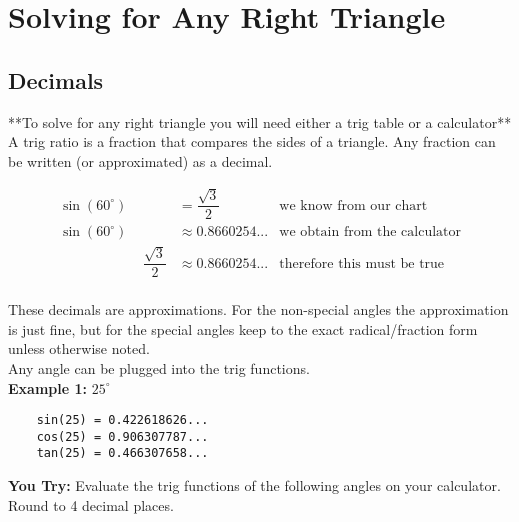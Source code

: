 \documentclass[12pt]{article}
\begin{document}
\section*{Solving for Any Right Triangle}

\subsection*{Decimals}

**To solve for any right triangle you will need either a trig table or a calculator** \\

A trig ratio is a fraction that compares the sides of a triangle. Any fraction can be written (or approximated) as a decimal. 


\begin{align*}
\sin(60^\circ)&=\dfrac{\sqrt{3}}{2}  &\text{we know from our chart}\\
\sin(60^\circ)&\approx 0.8660254... &\text{we obtain from the calculator}\\
\hspace{1in}\dfrac{\sqrt{3}}{2} &\approx  0.8660254...& \text{therefore this must be true}\\
\end{align*}


These decimals are approximations. For the non-special angles the approximation is just fine, but for the special angles keep to the exact radical/fraction form unless otherwise noted.\\

Any angle can be plugged into the trig functions. \\

\textbf{Example 1:} $25^\circ$
\begin{center}
\begin{BVerbatim}
	sin(25) = 0.422618626...
	cos(25) = 0.906307787...
	tan(25) = 0.466307658...
\end{BVerbatim}
\end{center}

\textbf{You Try:} Evaluate the trig functions of the following angles on your calculator. Round to 4 decimal places.\\
\end{document}
